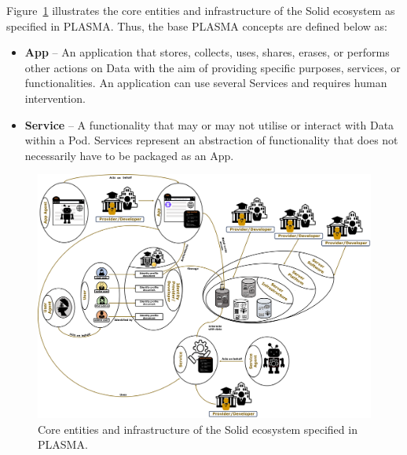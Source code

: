 Figure~\ref{fig:solid_plasma} illustrates the core entities and infrastructure of the Solid ecosystem as specified in PLASMA.
Thus, the base PLASMA concepts are defined below as:

\begin{itemize}
    \item \textbf{App} -- An application that stores, collects, uses, shares, erases, or performs other actions on Data with the aim of providing specific purposes, services, or functionalities. An application can use several Services and requires human intervention.
    \item \textbf{Service} -- A functionality that may or may not utilise or interact with Data within a Pod. Services represent an abstraction of functionality that does not necessarily have to be packaged as an App.
\end{itemize}

\begin{landscape}
\begin{figure}[htbp]
    \centering
    \includegraphics[width=\linewidth]{figures/chapter-4/solid-infrastructure-actors.png}
    \caption{Core entities and infrastructure of the Solid ecosystem specified in PLASMA.}
    \label{fig:solid_plasma}
\end{figure}
\end{landscape}

